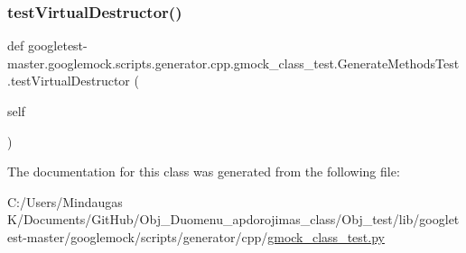 \mbox{\label{classgoogletest-master_1_1googlemock_1_1scripts_1_1generator_1_1cpp_1_1gmock__class__test_1_1_generate_methods_test_a1b1c2224e7a802e42b4b452a3b678989}} 
\subsubsection{\texorpdfstring{testVirtualDestructor()}{testVirtualDestructor()}}
{\footnotesize\ttfamily def googletest-\/master.\+googlemock.\+scripts.\+generator.\+cpp.\+gmock\+\_\+class\+\_\+test.\+Generate\+Methods\+Test.\+test\+Virtual\+Destructor (\begin{DoxyParamCaption}\item[{}]{self }\end{DoxyParamCaption})}



The documentation for this class was generated from the following file\+:\begin{DoxyCompactItemize}
\item 
C\+:/\+Users/\+Mindaugas K/\+Documents/\+Git\+Hub/\+Obj\+\_\+\+Duomenu\+\_\+apdorojimas\+\_\+class/\+Obj\+\_\+test/lib/googletest-\/master/googlemock/scripts/generator/cpp/\mbox{\hyperlink{_obj__test_2lib_2googletest-master_2googlemock_2scripts_2generator_2cpp_2gmock__class__test_8py}{gmock\+\_\+class\+\_\+test.\+py}}\end{DoxyCompactItemize}
